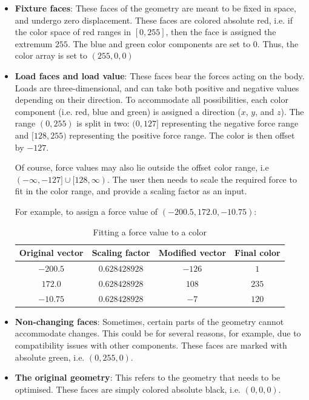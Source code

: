 \begin{itemize}
	\item \textbf{Fixture faces}: These faces of the geometry are meant to be fixed in space, and undergo zero displacement. These faces are colored absolute red, i.e. if the color space of red ranges in {$[0, 255]$}, then the face is assigned the extremum $255$. The blue and green color components are set to $0$. Thus, the color array is set to $(255, 0, 0)$
	\item \textbf{Load faces and load value}: These faces bear the forces acting on the body. Loads are three-dimensional, and can take both positive and negative values depending on their direction. To accommodate all possibilities, each color component (i.e. red, blue and green) is assigned a direction ($x$, $y$, and $z$). The range $(0, 255)$ is split in two: $(0, 127]$ representing the negative force range and $[128, 255)$ representing the positive force range. The color is then offset by $-127$. 

Of course, force values may also lie outside the offset color range, i.e $(-\infty, -127] \cup [128, \infty)$. The user then needs to scale the required force to fit in the color range, and provide a scaling factor as an input.

For example, to assign a force value of $(-200.5, 172.0, -10.75)$:

\begin{table}[h!]
	\begin{center}
		\caption{Fitting a force value to a color}
		\label{LoadFaceExample}
		\begin{tabular}{cccc}
			\toprule
			{\small Original vector} & {\small Scaling factor} & {\small Modified vector} & {\small Final color}\\
			\midrule
			$-200.5$ & $0.628428928$ & $-126$ & $1$\\
			$172.0$  & $0.628428928$ & $108$  & $235$\\
			$-10.75$ & $0.628428928$ & $-7$   & $120$\\
			\bottomrule
		\end{tabular}
	\end{center}
\end{table}
	\item \textbf{Non-changing faces}: Sometimes, certain parts of the geometry cannot accommodate changes. This could be for several reasons, for example, due to compatibility issues with other components. These faces are marked with absolute green, i.e. $(0, 255, 0)$.
	\item \textbf{The original geometry}: This refers to the geometry that needs to be optimised. These faces are simply colored absolute black, i.e. $(0, 0, 0)$.
\end{itemize}

